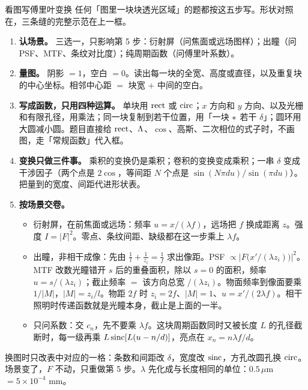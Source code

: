 \begin{recipe}[label=rcp:readfig]{看图写傅里叶变换}
任何「图里一块块透光区域」的题都按这五步写。形状对照在\pageref{fml:shapes}，三条缝的完整示范在上一框。
\begin{enumerate}
\item \textbf{认场景。} 三选一，只影响第 5 步：衍射屏（问焦面或远场图样）；出瞳（问 PSF、MTF、条纹对比度）；纯周期函数（问傅里叶系数）。
\item \textbf{量图。} 阴影 $=1$，空白 $=0$。读出每一块的全宽、高度或直径，以及重复块的中心坐标。相邻中心距 $=$ 块宽 $+$ 中间的空白。
\item \textbf{写成函数，只用四种运算。} 单块用 $\operatorname{rect}$ 或 $\operatorname{circ}$；$x$ 方向和 $y$ 方向、以及光栅和有限孔径，用乘法；同一块复制到若干位置，用「一块 $\ast$ 若干 $\delta$」；圆环用大圆减小圆。题目直接给 $\operatorname{rect}$、$\Lambda$、$\cos$、高斯、二次相位的式子时，不画图，走「常规函数」代入框。
\item \textbf{变换只做三件事。} 乘积的变换仍是乘积；卷积的变换变成乘积；一串 $\delta$ 变成干涉因子（两个点是 $2\cos$，等间距 $N$ 个点是 $\sin(N\pi du)/\sin(\pi du)$）。把量到的宽度、间距代进形状表。
\item \textbf{按场景交卷。}
\begin{itemize}
\item 衍射屏，在前焦面或远场：频率 $u=x/(\lambda f)$，远场把 $f$ 换成距离 $z$。强度 $I=|F|^2$。零点、条纹间距、缺级都在这一步乘上 $\lambda f$。
\item 出瞳，非相干成像：先由 $\frac1l+\frac1{z_i}=\frac1f$ 求出像距。PSF $\propto\big|F\big(x'/(\lambda z_i)\big)\big|^2$。MTF 改数光瞳错开 $s$ 后的重叠面积，除以 $s=0$ 的面积，频率 $u=s/(\lambda z_i)$；截止频率 $=$ 该方向总宽 $/(\lambda z_i)$。物面频率到像面要乘 $1/|M|$，$|M|=z_i/l$。物距 $2f$ 时 $z_i=2f$、$|M|=1$、$u=x'/(2\lambda f)$。相干照明时传递函数就是光瞳本身，截止是上面的一半。
\item 只问系数：交 $c_n$，先不要乘 $\lambda f$。这块周期函数同时又被长度 $L$ 的孔径截断时，每一级再乘 $L\operatorname{sinc}[L(u-n/d)]$，亮点在 $x_n=n\lambda f/d$。
\end{itemize}
\end{enumerate}
换图时只改表中对应的一格：条数和间距改 $\delta$，宽度改 $\operatorname{sinc}$，方孔改圆孔换 $\operatorname{circ}$。场景变了，$F$ 不动，只重做第 5 步。$\lambda$ 先化成与长度相同的单位：$0.5\,\mu$m $=5\times10^{-4}$ mm。
\end{recipe}


